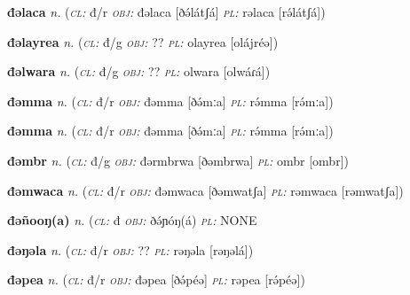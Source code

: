 \newentry
\headword\textbf{đəlaca}  
\ipa{[ðə́látʃá]}
\synpos\textit{n.} 
\class(\textit{\textsc{cl:}} {đ/r}
\object\textit{\textsc{obj:}} đəlaca [ðə́látʃá]
\plural\textit{\textsc{pl:}} rəlaca [rə́látʃá])

\newentry
\headword\textbf{đəlayrea}  
\synpos\textit{n.} 
\class(\textit{\textsc{cl:}} {đ/g}
\object\textit{\textsc{obj:}} ??
\plural\textit{\textsc{pl:}} olayrea [olájréə])

\newentry
\headword\textbf{đəlwara}  
\ipa{[ðəlwáɾá]}
\synpos\textit{n.} 
\class(\textit{\textsc{cl:}} {đ/g}
\object\textit{\textsc{obj:}} ??
\plural\textit{\textsc{pl:}} olwara [olwáɾá])

\newentry
\headword\textbf{đəmma}  
\ipa{[ðə́mːa]}
\synpos\textit{n.} 
\class(\textit{\textsc{cl:}} {đ/r}
\object\textit{\textsc{obj:}} đəmma [ðə́mːa]
\plural\textit{\textsc{pl:}} rə́mma [rə́mːa])

\newentry
\headword\textbf{đəmma}  
\ipa{[ðə́mːa]}
\synpos\textit{n.} 
\class(\textit{\textsc{cl:}} {đ/r}
\object\textit{\textsc{obj:}} đəmma [ðə́mːa]
\plural\textit{\textsc{pl:}} rə́mma [rə́mːa])

\newentry
\headword\textbf{đəmbr}  
\ipa{[ðəmbr]}
\synpos\textit{n.} 
\class(\textit{\textsc{cl:}} {đ/g}
\object\textit{\textsc{obj:}} đərmbrwa [ðəmbrwa]
\plural\textit{\textsc{pl:}} ombr [ombr])

\newentry
\headword\textbf{đəmwaca}  
\ipa{[ðəmwatʃa]}
\synpos\textit{n.} 
\class(\textit{\textsc{cl:}} {đ/r}
\object\textit{\textsc{obj:}} đəmwaca [ðəmwatʃa]
\plural\textit{\textsc{pl:}} rəmwaca [rəmwatʃa])


\newentry
\headword\textbf{đəñooŋ(a)}  
\ipa{[ðə́ɲóŋ(á)]}
\synpos\textit{n.} 
\class(\textit{\textsc{cl:}} {đ}
\object\textit{\textsc{obj:}} ðə́ɲóŋ(á)
\plural\textit{\textsc{pl:}} NONE


\newentry
\headword\textbf{đəŋəla}  
\ipa{[ðəŋəlá]}
\synpos\textit{n.} 
\class(\textit{\textsc{cl:}} {đ/r}
\object\textit{\textsc{obj:}} ??
\plural\textit{\textsc{pl:}} rəŋəla [rəŋəlá])

\newentry
\headword\textbf{đəpea}  
\ipa{[ðə́péə]}
\synpos\textit{n.} 
\class(\textit{\textsc{cl:}} {đ/r}
\object\textit{\textsc{obj:}} đəpea [ðə́péə]
\plural\textit{\textsc{pl:}} rəpea [rə́péə])



